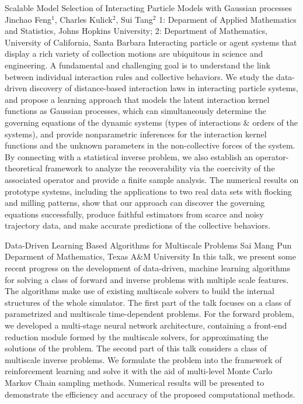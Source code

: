 \vspace{1.5ex}
\abs
{Scalable Model Selection of Interacting Particle Models with Gaussian processes}
{Jinchao Feng$^1$, Charles Kulick$^2$, Sui Tang$^2$}
{1: Deparment of Applied Mathematics and Statistics, Johns Hopkins University; 2: Department of Mathematics, University of California, Santa Barbara}
{Interacting particle or agent systems that display a rich variety of collection motions are ubiquitous in science and engineering. A fundamental and challenging goal is to understand the link between individual interaction rules and collective behaviors. We study the data-driven discovery of distance-based interaction laws in interacting particle systems, and propose a learning approach that models the latent interaction kernel functions as Gaussian processes, which can simultaneously determine the governing equations of the dynamic systems (types of interactions $\&$ orders of the systems), and provide nonparametric inferences for the interaction kernel functions and the unknown parameters in the non-collective forces of the system. By connecting with a statistical inverse problem, we also establish an operator-theoretical framework to analyze the recoverability via the coercivity of the associated operator and provide a finite sample analysis. The numerical results on prototype systems, including the applications to two real data sets with flocking and milling patterns, show that our approach can discover the governing equations successfully, produce faithful estimators from scarce and noisy trajectory data, and make accurate predictions of the collective behaviors.}


\vspace{1.5ex}
\abs
{Data-Driven Learning Based Algorithms for Multiscale Problems}
{Sai Mang Pun}
{Deparment of Mathematics, Texas A\&M University}
{In this talk, we present some recent progress on the development of data-driven, machine learning algorithms for solving a class of forward and inverse problems with multiple scale features. The algorithms make use of existing multiscale solvers to build the internal structures of the whole simulator. The first part of the talk focuses on a class of parametrized and multiscale time-dependent problems. For the forward problem, we developed a multi-stage neural network architecture, containing a front-end reduction module formed by the multiscale solvers, for approximating the solutions of the problem. The second part of this talk considers a class of multiscale inverse problems. We formulate the problem into the framework of reinforcement learning and solve it with the aid of multi-level Monte Carlo Markov Chain sampling methods. Numerical results will be presented to demonstrate the efficiency and accuracy of the proposed computational methods.}


